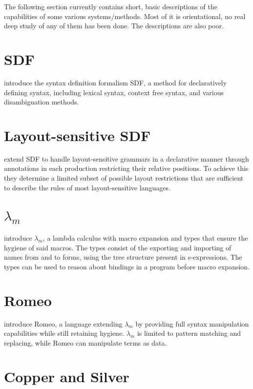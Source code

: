 \documentclass{kththesis}
\begin{document}
The following section currently contains short, basic descriptions of the capabilities of some various systems/methods. Most of it is orientational, no real deep study of any of them has been done. The descriptions are also poor.

\section{SDF}

\textcite{Heering1989} introduce the syntax definition formalism SDF, a method for declaratively defining syntax, including lexical syntax, context free syntax, and various disambiguation methods.

\section{Layout-sensitive SDF}

\textcite{Erdweg2013} extend SDF to handle layout-sensitive grammars in a declarative manner through annotations in each production restricting their relative positions. To achieve this they determine a limited subset of possible layout restrictions that are sufficient to describe the rules of most layout-sensitive languages.

\section{$\lambda_m$}

\textcite{Herman2010} introduce $\lambda_m$, a lambda calculus with macro expansion and types that ensure the hygiene of said macros. The types consist of the exporting and importing of names from and to forms, using the tree structure present in s-expressions. The types can be used to reason about bindings in a program before macro expansion.

\section{Romeo}

\textcite{Stansifer2014} introduce Romeo, a language extending $\lambda_m$ by providing full syntax manipulation capabilities while still retaining hygiene. $\lambda_m$ is limited to pattern matching and replacing, while Romeo can manipulate terms as data.

\section{Copper and Silver}
\end{document}
